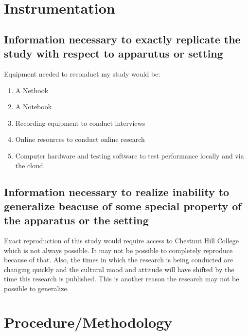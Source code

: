 \documentclass[12pt,oneside,letterpaper]{article}
\begin{document}
\section{Instrumentation}


\subsection{Information necessary to exactly replicate the study with respect to apparutus or setting}

Equipment needed to reconduct my study would be:

\begin{enumerate}

\item A Netbook

\item A Notebook

\item Recording equipment to conduct interviews

\item Online resources to conduct online research

\item Computer hardware and testing software to test performance locally and via
  the cloud.

\end{enumerate}

\subsection{Information necessary to realize inability to generalize beacuse of some special property of the apparatus or the setting}

Exact reproduction of this study would require access to Chestnut Hill College
which is not always possible.  It may not be possible to completely reproduce
because of that.  Also, the times in which the research is being conducted are
changing quickly and the cultural mood and attitude will have shifted by the
time this research is published.  This is another reason the research may not be
possible to generalize. 

\section{Procedure/Methodology}

\end{document}
